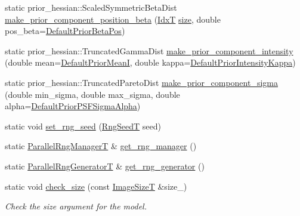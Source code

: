 \begin{DoxyCompactItemize}
\item 
static prior\+\_\+hessian\+::\+Scaled\+Symmetric\+Beta\+Dist \hyperlink{classmappel_1_1PointEmitterModel_a1f6f12bdf0e6fc374bf217172fc0ccef}{make\+\_\+prior\+\_\+component\+\_\+position\+\_\+beta} (\hyperlink{namespacemappel_ab17ec0f30b61ece292439d7ece81d3a8}{IdxT} \hyperlink{classmappel_1_1ImageFormat1DBase_a8941b4d028e4dd881146a7c1b9039bb1}{size}, double pos\+\_\+beta=\hyperlink{classmappel_1_1PointEmitterModel_a2771dc4415f351862619cd9671b5310d}{Default\+Prior\+Beta\+Pos})
\item 
static prior\+\_\+hessian\+::\+Truncated\+Gamma\+Dist \hyperlink{classmappel_1_1PointEmitterModel_a41deeb728d8fae68ca474e97ea73d429}{make\+\_\+prior\+\_\+component\+\_\+intensity} (double mean=\hyperlink{classmappel_1_1PointEmitterModel_a607fcdea787b0cc3c6ac8804d378d1b1}{Default\+Prior\+MeanI}, double kappa=\hyperlink{classmappel_1_1PointEmitterModel_a03d9f90c130df2d42d0d31c9337e914c}{Default\+Prior\+Intensity\+Kappa})
\item 
static prior\+\_\+hessian\+::\+Truncated\+Pareto\+Dist \hyperlink{classmappel_1_1PointEmitterModel_a7506af8d9e430e63a56972eb64709fca}{make\+\_\+prior\+\_\+component\+\_\+sigma} (double min\+\_\+sigma, double max\+\_\+sigma, double alpha=\hyperlink{classmappel_1_1PointEmitterModel_a2b06111eaa1ff284851c2e67a3827220}{Default\+Prior\+P\+S\+F\+Sigma\+Alpha})
\item 
static void \hyperlink{classmappel_1_1PointEmitterModel_a046d5bd901c8dfde61f082c2634beec0}{set\+\_\+rng\+\_\+seed} (\hyperlink{namespacemappel_a318bca259a7add5979160939a3f4e60b}{Rng\+SeedT} seed)
\item 
static \hyperlink{namespacemappel_acf276a4212f07b1ed4cb2ddce379ba1d}{Parallel\+Rng\+ManagerT} \& \hyperlink{classmappel_1_1PointEmitterModel_ae876f0fa81613161a064452973bfb558}{get\+\_\+rng\+\_\+manager} ()
\item 
static \hyperlink{namespacemappel_ad1e99b214465229065d30f881a89d1cc}{Parallel\+Rng\+GeneratorT} \& \hyperlink{classmappel_1_1PointEmitterModel_af9f6630e9d496bb83e151f00522ecc2d}{get\+\_\+rng\+\_\+generator} ()
\item 
static void \hyperlink{classmappel_1_1ImageFormat1DBase_a2eb986335c4d1405de65217456735ba4}{check\+\_\+size} (const \hyperlink{classmappel_1_1ImageFormat1DBase_a6456bab2b26702022ee32ae19e90dcac}{Image\+SizeT} \&size\+\_\+)
\begin{DoxyCompactList}\small\item\em Check the size argument for the model. \end{DoxyCompactList}\end{DoxyCompactItemize}
